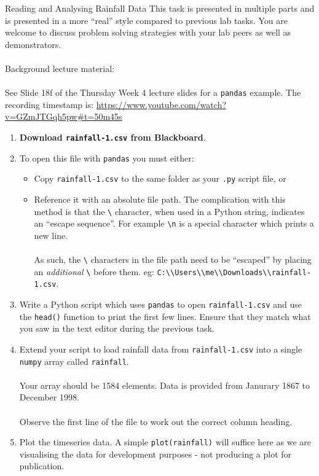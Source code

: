 \documentclass{lab}
\begin{document}
\pagebreak
\begin{task}{Reading and Analysing Rainfall Data}{}
This task is presented in multiple parts and is presented in a more ``real'' style compared to previous lab tasks. You are welcome to discuss problem solving strategies with your lab peers as well as demonstrators.
\\~\\
Background lecture material: \\~\\
See Slide 18f of the Thursday Week 4 lecture slides for a \texttt{pandas} example. The recording timestamp is: \url{https://www.youtube.com/watch?v=GZmJTGqh5pw#t=50m45s}\\
\begin{enumerate}
\item \textbf{Download \texttt{rainfall-1.csv} from Blackboard}.
\item To open this file with \texttt{pandas} you must either:
\begin{itemize}
\item Copy \texttt{rainfall-1.csv} to the same folder as your \texttt{.py} script file, or
\item Reference it with an absolute file path. The complication with this method is that the \texttt{\textbackslash} character, when used in a Python string, indicates an ``escape sequence''. For example \texttt{\textbackslash n} is a special character which prints a new line.
\\~\\
As such, the \texttt{\textbackslash} characters in the file path need to be ``escaped'' by placing an \textit{additional} \texttt{\textbackslash} before them. eg: \texttt{C:\textbackslash\textbackslash Users\textbackslash \textbackslash me\textbackslash \textbackslash Downloads\textbackslash \textbackslash rainfall-1.csv}.
\end{itemize}
\item Write a Python script which uses \texttt{pandas} to open \texttt{rainfall-1.csv} and use the \texttt{head()} function to print the first few lines. Ensure that they match what you saw in the text editor during the previous task.
\item Extend your script to load rainfall data from \texttt{rainfall-1.csv} into a single \texttt{numpy} array called \texttt{rainfall}.
\\~\\
Your array should be 1584 elements. Data is provided from Janurary 1867 to December 1998.
\\~\\
Observe the first line of the file to work out the correct column heading.
\item Plot the timeseries data. A simple \texttt{plot(rainfall)} will suffice here as we are visualising the data for development purposes - not producing a plot for publication.


\end{enumerate}
\end{task}
\end{document}
